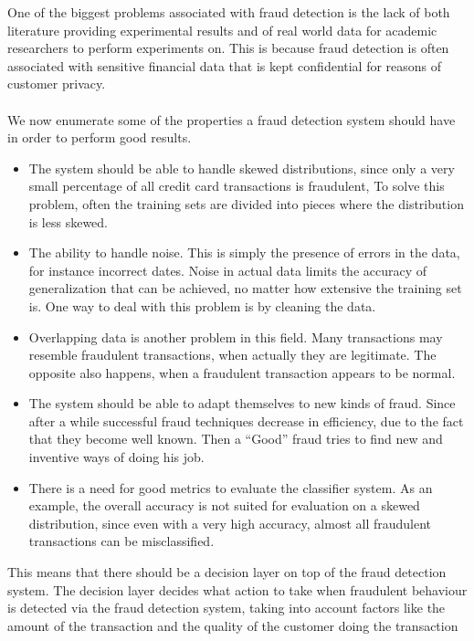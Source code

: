 \documentclass{report}
\begin{document}
One of the biggest problems associated with fraud detection is the lack of both literature providing experimental results and of real world data for academic researchers to perform experiments on. This is because fraud detection is often associated with sensitive financial data that is kept confidential for reasons of customer privacy. 
\paragraph{}
We now enumerate some of the properties a fraud detection system should have in order to perform good results. 

\begin{itemize}
  \item The system should be able to handle skewed distributions, since only a very small percentage of all credit card transactions is fraudulent, To solve this problem, often the training sets are divided into pieces where the distribution is less skewed.

  \item The ability to handle noise. This is simply the presence of errors in the data, for instance incorrect dates. Noise in actual data limits the accuracy of generalization that can be achieved, no matter how extensive the training set is. One way to deal with this problem is by cleaning the data. 
  
  \item Overlapping data is another problem in this field. Many transactions may resemble fraudulent transactions, when actually they are legitimate. The opposite also happens, when a fraudulent transaction appears to be normal. 


\item The system should be able to adapt themselves to new kinds of fraud. Since after a while successful fraud techniques decrease in efficiency, due to the fact that they become well known. Then a “Good” fraud tries to find new and inventive ways of doing his job.

\item There is a need for good metrics to evaluate the classifier system. As an example, the overall accuracy is not suited for evaluation on a skewed distribution, since even with a very high accuracy, almost all fraudulent transactions can be misclassified. 


\end{itemize}

This means that there should be a decision layer on top of the fraud detection system. The decision layer decides what action to take when fraudulent behaviour is detected via the fraud detection system, taking into account factors like the amount of the transaction and the quality of the customer doing the transaction 
\end{document}
